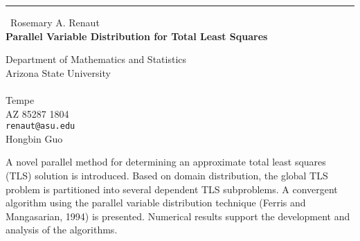 \documentclass{report}
\begin{document}
\begin{center}
\rule{6in}{1pt} \
{\large Rosemary A. Renaut \\
{\bf Parallel Variable Distribution for Total Least Squares}}

Department of Mathematics and Statistics \\ Arizona State University \\ \\ Tempe \\ AZ 85287 1804
\\
{\tt renaut@asu.edu}\\
Hongbin Guo\end{center}

A novel parallel method for determining an approximate
total least squares (TLS) solution is introduced. Based on domain
distribution, the global TLS problem is partitioned into several
dependent TLS subproblems. A convergent algorithm using the parallel
variable distribution technique (Ferris and Mangasarian, 1994) is
presented. Numerical results support the development and analysis of the
algorithms.
\end{document}
